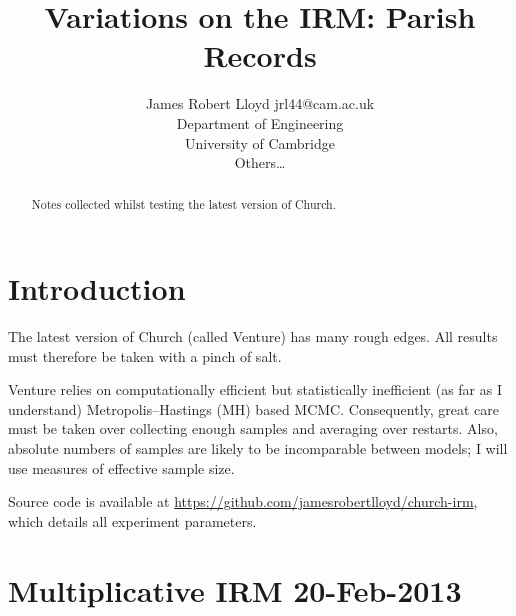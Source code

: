 \documentclass[twoside,11pt]{article}
\begin{document}
\lstset{language=Lisp,basicstyle=\ttfamily\footnotesize} 

\title{Variations on the IRM: Parish Records}

\author{\name James Robert Lloyd \email jrl44@cam.ac.uk \\
       \addr Department of Engineering\\
       University of Cambridge\\
       \AND
       \name Others\dots}


\maketitle

\begin{abstract}
Notes collected whilst testing the latest version of Church.
\end{abstract}


\section{Introduction}

The latest version of Church (called Venture) has many rough edges.
All results must therefore be taken with a pinch of salt.

Venture relies on computationally efficient but statistically inefficient (as far as I understand) Metropolis--Hastings (MH) based MCMC.
Consequently, great care must be taken over collecting enough samples and averaging over restarts.
Also, absolute numbers of samples are likely to be incomparable between models; I will use measures of effective sample size.

Source code is available at \url{https://github.com/jamesrobertlloyd/church-irm}, which details all experiment parameters.

\section{Multiplicative IRM 20-Feb-2013}
\end{document}
